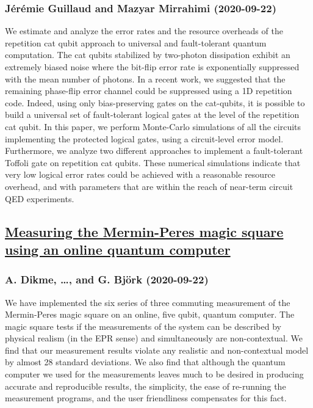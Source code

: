 {\subsubsection*{Jérémie Guillaud and Mazyar Mirrahimi (2020-09-22)}
We estimate and analyze the error rates and the resource overheads of the
repetition cat qubit approach to universal and fault-tolerant quantum
computation. The cat qubits stabilized by two-photon dissipation exhibit an
extremely biased noise where the bit-flip error rate is exponentially
suppressed with the mean number of photons. In a recent work, we suggested that
the remaining phase-flip error channel could be suppressed using a 1D
repetition code. Indeed, using only bias-preserving gates on the cat-qubits, it
is possible to build a universal set of fault-tolerant logical gates at the
level of the repetition cat qubit. In this paper, we perform Monte-Carlo
simulations of all the circuits implementing the protected logical gates, using
a circuit-level error model. Furthermore, we analyze two different approaches
to implement a fault-tolerant Toffoli gate on repetition cat qubits. These
numerical simulations indicate that very low logical error rates could be
achieved with a reasonable resource overhead, and with parameters that are
within the reach of near-term circuit QED experiments.

\subsection*{\href{http://arxiv.org/abs/2009.10751v1}{Measuring the Mermin-Peres magic square using an online quantum computer}}
\subsubsection*{A. Dikme, \dots, and G. Björk (2020-09-22)}
We have implemented the six series of three commuting measurement of the
Mermin-Peres magic square on an online, five qubit, quantum computer. The magic
square tests if the measurements of the system can be described by physical
realism (in the EPR sense) and simultaneously are non-contextual. We find that
our measurement results violate any realistic and non-contextual model by
almost 28 standard deviations. We also find that although the quantum computer
we used for the measurements leaves much to be desired in producing accurate
and reproducible results, the simplicity, the ease of re-running the
measurement programs, and the user friendliness compensates for this fact.

}

